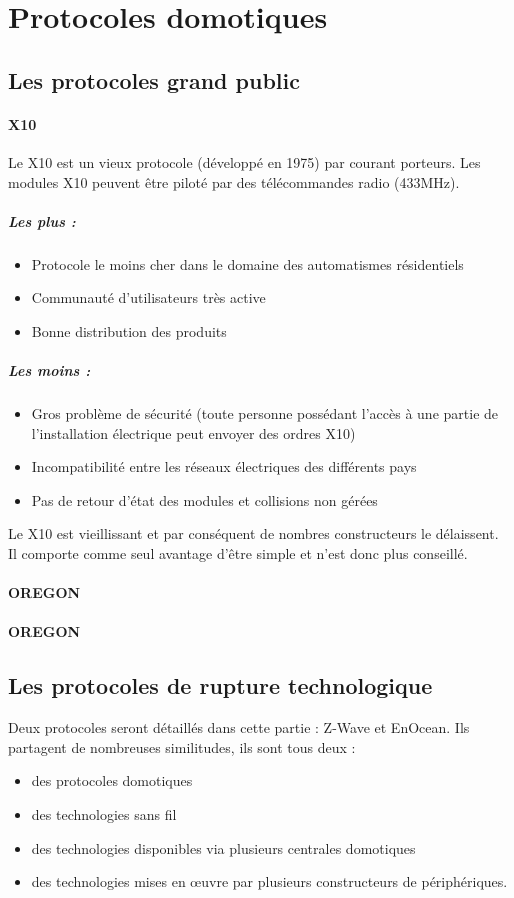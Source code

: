 \documentclass[a4paper,10pt]{article}
\begin{document}

\section{Protocoles domotiques}

\subsection{Les protocoles grand public}
\paragraph{X10}
Le X10 est un vieux protocole (développé en 1975) par courant porteurs.  Les modules X10 peuvent être piloté par des télécommandes radio (433MHz). 

\subparagraph{Les plus :}
\begin{itemize}
\item Protocole le moins cher dans le domaine des automatismes résidentiels
\item Communauté d'utilisateurs très active
\item Bonne distribution des produits
\end{itemize}
\subparagraph{Les moins :}
\begin{itemize}
\item Gros problème de sécurité (toute personne possédant l'accès à une partie de l'installation électrique peut envoyer des ordres X10)
\item Incompatibilité entre les réseaux électriques des différents pays
\item Pas de retour d'état des modules et collisions non gérées
\end{itemize}
Le X10 est vieillissant et par conséquent de nombres constructeurs le délaissent. Il comporte comme seul avantage d'être simple et n'est donc plus conseillé.
\paragraph{OREGON}
\paragraph{OREGON}


\subsection{Les protocoles de rupture technologique}
Deux protocoles seront détaillés dans cette partie : Z-Wave et EnOcean. Ils partagent de nombreuses similitudes, ils sont tous deux :
\begin{itemize}
\item des protocoles domotiques
\item des technologies sans fil
\item des technologies disponibles via plusieurs centrales domotiques
\item des technologies mises en œuvre par plusieurs constructeurs de périphériques.

\end{itemize}
\end{document}
